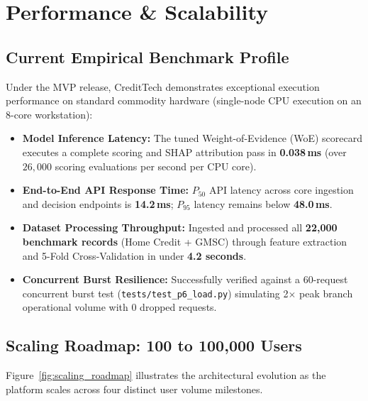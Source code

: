 \chapter{Performance \& Scalability}
\label{chap:performance_scalability}

\section{Current Empirical Benchmark Profile}
Under the MVP release, CreditTech demonstrates exceptional execution performance on standard commodity hardware (single-node CPU execution on an 8-core workstation):
\begin{itemize}
  \item \textbf{Model Inference Latency:} The tuned Weight-of-Evidence (WoE) scorecard executes a complete scoring and SHAP attribution pass in \textbf{0.038\,ms} (over $26,000$ scoring evaluations per second per CPU core).
  \item \textbf{End-to-End API Response Time:} $P_{50}$ API latency across core ingestion and decision endpoints is \textbf{14.2\,ms}; $P_{95}$ latency remains below \textbf{48.0\,ms}.
  \item \textbf{Dataset Processing Throughput:} Ingested and processed all \textbf{22,000 benchmark records} (Home Credit + GMSC) through feature extraction and 5-Fold Cross-Validation in under \textbf{4.2 seconds}.
  \item \textbf{Concurrent Burst Resilience:} Successfully verified against a 60-request concurrent burst test (\texttt{tests/test\_p6\_load.py}) simulating 2$\times$ peak branch operational volume with 0 dropped requests.
\end{itemize}

\section{Scaling Roadmap: 100 to 100,000 Users}
Figure~\ref{fig:scaling_roadmap} illustrates the architectural evolution as the platform scales across four distinct user volume milestones.

